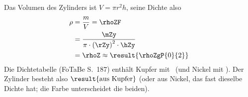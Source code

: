 Das Volumen des Zylinders ist $V = \pi r^2 h$, seine Dichte also
\begin{align}
 \rho &= \frac{m}{V} = \rhoZF \\
   &= \frac{\mZy}{\pi\cdot\left(\rZy\right)^2\cdot\hZy} \\
   &= \rhoZ \approx \result{\rhoZgP{0}{2}}
\end{align}
Die Dichtetabelle (FoTaBe S.~187) enthält Kupfer mit \rCuO\ (und Nickel mit \rNiO). Der Zylinder besteht also $\result{\text{aus Kupfer}}$ (oder aus Nickel, das fast dieselbe Dichte hat; die Farbe unterscheidet die beiden).
